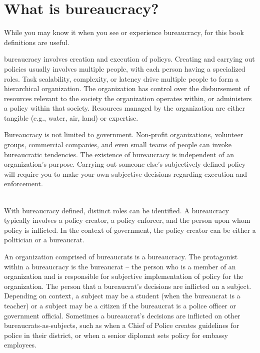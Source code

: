 \section{What is bureaucracy?\label{sec:define_bureaucracy}}

While you may know it when you see or experience bureaucracy, for this book definitions are useful. 

\gls{bureaucracy} involves creation and execution of \glspl{policy}. Creating and carrying out policies usually involves multiple people, with each person having a specialized roles. Task scalability, complexity, or latency drive multiple people to form a hierarchical organization. The organization has control over the disbursement of resources relevant to the society the organization operates within, or administers a policy within that society. Resources managed by the organization are either tangible (e.g., water, air, land) or expertise.  

Bureaucracy is not limited to government. Non-profit organizations, volunteer groups, commercial companies, and even small teams of people can invoke bureaucratic tendencies. The existence of bureaucracy is independent of an organization's purpose. Carrying out someone else's subjectively defined policy will require you to make your own subjective decisions regarding execution and enforcement. 

\ \\

With bureaucracy defined, distinct roles can be identified.
A bureaucracy typically involves a policy creator, a policy enforcer, and the person upon whom policy is inflicted. In the context of government, the policy creator can be either a politician or a bureaucrat. 

An organization comprised of bureaucrats is a \gls{bureaucracy}. The protagonist within a bureaucracy is the \gls{bureaucrat} -- the person who is a member of an organization and is responsible for subjective implementation of policy for the organization. The person that a bureaucrat's decisions are inflicted on a \gls{subject}.  Depending on context, a subject may be a student (when the bureaucrat is a teacher) or a subject may be a citizen if the bureaucrat is a police officer or government official. Sometimes a bureaucrat's decisions are inflicted on other bureaucrats-as-subjects, such as when a Chief of Police creates guidelines for police in their district, or when a senior diplomat sets policy for embassy employees. 


